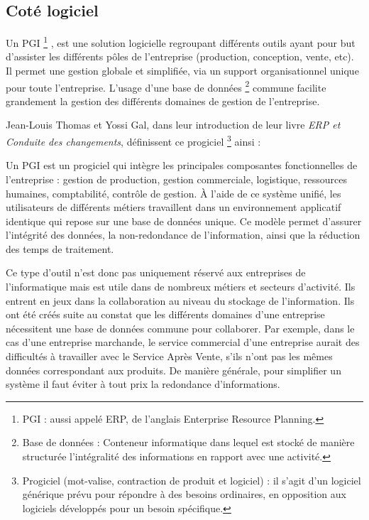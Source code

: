 \subsection{Coté logiciel}

Un \gls{PGI} \footnote{PGI : aussi appelé ERP, de l'anglais Enterprise Resource Planning.} , est une solution logicielle regroupant différents outils ayant pour but d'assister les différents pôles de l'entreprise (production, conception, vente, etc). Il permet une gestion globale et simplifiée, via un support organisationnel unique pour toute l'entreprise. L'usage d'une base de données \footnote{Base de données : Conteneur informatique dans lequel est stocké de manière structurée l'intégralité des informations en rapport avec une activité.} commune facilite grandement la gestion des différents domaines de gestion de l'entreprise.

Jean-Louis Thomas et Yossi Gal, dans leur introduction de leur livre \textit{ERP et Conduite des changements}, définissent ce progiciel \footnote{Progiciel (mot-valise, contraction de produit et logiciel) : il s'agit d'un logiciel  générique prévu pour répondre à des besoins ordinaires, en opposition aux logiciels développés pour un besoin spécifique.} ainsi :

\begin{Quote}
Un PGI est un progiciel qui intègre les principales composantes fonctionnelles de l'entreprise : gestion de production, gestion commerciale, logistique, ressources humaines, comptabilité, contrôle de gestion.
À l'aide de ce système unifié, les utilisateurs de différents métiers travaillent dans un environnement applicatif identique qui repose sur une base de données unique. Ce modèle permet d'assurer l'intégrité des données, la non-redondance de l'information, ainsi que la réduction des temps de traitement.
\end{Quote}


Ce type d'outil n'est donc pas uniquement réservé aux entreprises de l'informatique mais est utile dans de nombreux métiers et secteurs d'activité. Ils entrent en jeux dans la collaboration au niveau du stockage de l'information. Ils ont été créés suite au constat que les différents domaines d'une entreprise nécessitent une base de données commune pour collaborer. Par exemple, dans le cas d'une entreprise marchande, le service commercial d'une entreprise aurait des difficultés à travailler avec le Service Après Vente, s'ils n'ont pas les mêmes données correspondant aux produits. De manière générale, pour simplifier un système il faut éviter à tout prix la redondance d'informations.

